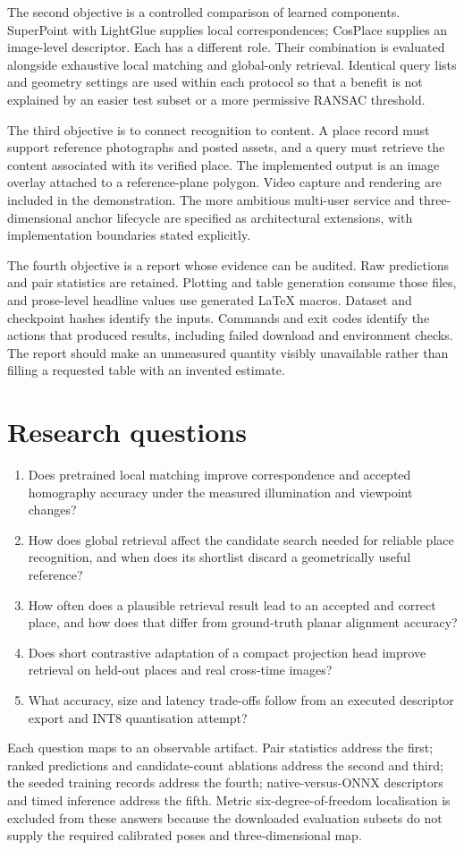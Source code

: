 The second objective is a controlled comparison of learned components. SuperPoint with LightGlue supplies local correspondences; CosPlace supplies an image-level descriptor. Each has a different role. Their combination is evaluated alongside exhaustive local matching and global-only retrieval. Identical query lists and geometry settings are used within each protocol so that a benefit is not explained by an easier test subset or a more permissive RANSAC threshold.

The third objective is to connect recognition to content. A place record must support reference photographs and posted assets, and a query must retrieve the content associated with its verified place. The implemented output is an image overlay attached to a reference-plane polygon. Video capture and rendering are included in the demonstration. The more ambitious multi-user service and three-dimensional anchor lifecycle are specified as architectural extensions, with implementation boundaries stated explicitly.

The fourth objective is a report whose evidence can be audited. Raw predictions and pair statistics are retained. Plotting and table generation consume those files, and prose-level headline values use generated LaTeX macros. Dataset and checkpoint hashes identify the inputs. Commands and exit codes identify the actions that produced results, including failed download and environment checks. The report should make an unmeasured quantity visibly unavailable rather than filling a requested table with an invented estimate.

\section{Research questions}
\begin{enumerate}
\item Does pretrained local matching improve correspondence and accepted homography accuracy under the measured illumination and viewpoint changes?
\item How does global retrieval affect the candidate search needed for reliable place recognition, and when does its shortlist discard a geometrically useful reference?
\item How often does a plausible retrieval result lead to an accepted and correct place, and how does that differ from ground-truth planar alignment accuracy?
\item Does short contrastive adaptation of a compact projection head improve retrieval on held-out places and real cross-time images?
\item What accuracy, size and latency trade-offs follow from an executed descriptor export and INT8 quantisation attempt?
\end{enumerate}
Each question maps to an observable artifact. Pair statistics address the first; ranked predictions and candidate-count ablations address the second and third; the seeded training records address the fourth; native-versus-ONNX descriptors and timed inference address the fifth. Metric six-degree-of-freedom localisation is excluded from these answers because the downloaded evaluation subsets do not supply the required calibrated poses and three-dimensional map.

